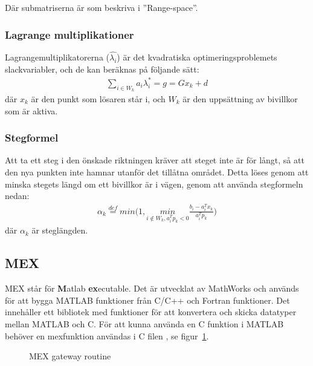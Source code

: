 Där submatriserna är som beskriva i ''Range-space''\citep{numericaloptimization}.
\subsubsection{Lagrange multiplikationer}
Lagrangemultiplikatorerna ($\hat{\lambda_i}$) är det kvadratiska optimeringsproblemets slackvariabler, och de kan beräknas på följande sätt: \\ 
\begin{equation*}
\begin{aligned}
\sum_{i \in W_k} a_i \lambda_i^* = g = G x_k + d
\end{aligned}
\end{equation*}
där $x_k$ är den punkt som lösaren står i, och $W_k$ är den uppsättning av bivillkor som är aktiva.


\subsubsection{Stegformel}
Att ta ett steg i den önskade riktningen kräver att steget inte är för långt, så att den nya punkten inte hamnar utanför det tillåtna området. Detta löses genom att minska stegets längd om ett bivillkor är i vägen, genom att använda stegformeln nedan:
\begin{equation*}
\begin{aligned}
\alpha_k\overset{def}{=}min \bigg(1,\underset{i\notin W_k,a_i^Tp_k<0}{min} \frac{b_i-a_i^Tx_k}{a_i^Tp_k} \bigg)
\end{aligned}
\end{equation*}
där $\alpha_k$ är steglängden. 

\subsection{MEX}
\label{sec:mex}
MEX står för \textbf{M}atlab \textbf{ex}ecutable. Det är utvecklat av MathWorks och används för att bygga MATLAB funktioner från C/C++ och Fortran funktioner. Det innehåller ett bibliotek med funktioner för att konvertera och skicka datatyper mellan MATLAB och C. För att kunna använda en C funktion i MATLAB behöver en mexfunktion användas i C filen \citep{mathworks}, se figur~\ref{fig:mex}. 

\begin{figure}[H]

\caption{MEX gateway routine}
\label{fig:mex}
\end{figure}  

